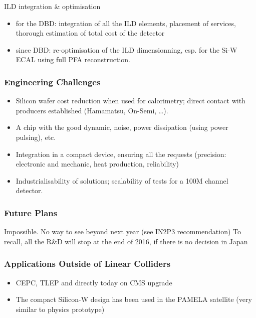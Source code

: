 ILD integration \& optimisation
\begin{itemize}
	\item for the DBD: integration of all the ILD elements, placement of services, thorough estimation of total cost of the detector
	\item since DBD: re-optimisation of the ILD dimensionning, esp. for the Si-W ECAL using full PFA reconstruction.
\end{itemize}

\subsubsection{Engineering Challenges}
\begin{itemize}
	\item Silicon wafer cost reduction when used for calorimetry; direct contact with producers established (Hamamatsu, On-Semi, \ldots).
	\item A chip with the good dynamic, noise, power dissipation (using power pulsing), etc. 
	\item Integration in a compact device, ensuring all the requests (precision: electronic and mechanic, heat production, reliability)
	\item Industrialisability of solutions; scalability of tests for a 100M channel detector.
\end{itemize}
\subsubsection{Future Plans}
Impossible. No way to see beyond next year (see IN2P3 recommendation)
To recall, all the R\&D will stop at the end of 2016, if there is no decision in Japan
\subsubsection{Applications Outside of Linear Colliders}
\begin{itemize}
	\item CEPC, TLEP and directly today on CMS upgrade
	\item The compact Silicon-W design has been used in the PAMELA satellite (very similar to physics prototype)
\end{itemize}
